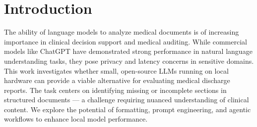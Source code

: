 \section{Introduction}
The ability of language models to analyze medical documents is of increasing importance in clinical decision support and medical auditing. While commercial models like ChatGPT have demonstrated strong performance in natural language understanding tasks, they pose privacy and latency concerns in sensitive domains. This work investigates whether small, open-source LLMs running on local hardware can provide a viable alternative for evaluating medical discharge reports. The task centers on identifying missing or incomplete sections in structured documents — a challenge requiring nuanced understanding of clinical content. We explore the potential of formatting, prompt engineering, and agentic workflows to enhance local model performance.
